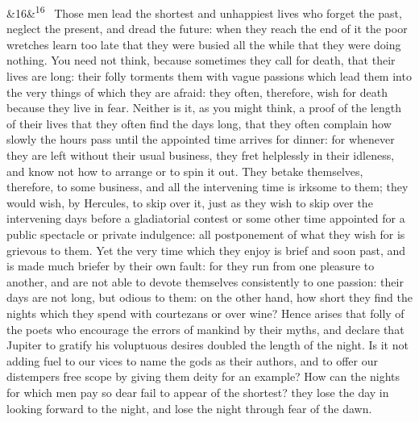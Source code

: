 \documentclass[12pt]{article}
\newcommand{\para}[1][]{\par\noindent\ifx&#1&\else\textsuperscript{\footnotesize #1}~\fi}
\begin{document}
\para[16] Those men lead the shortest and unhappiest lives who forget the past, neglect the present, and dread the future: when they reach the end of it the poor wretches learn too late that they were busied all the while that they were doing nothing. You need not think, because sometimes they call for death, that their lives are long: their folly torments them with vague passions which lead them into the very things of which they are afraid: they often, therefore, wish for death because they live in fear. Neither is it, as you might think, a proof of the length of their lives that they often find the days long, that they often complain how slowly the hours pass until the appointed time arrives for dinner: for whenever they are left without their usual business, they fret helplessly in their idleness, and know not how to arrange or to spin it out. They betake themselves, therefore, to some business, and all the intervening time is irksome to them; they would wish, by Hercules, to skip over it, just as they wish to skip over the intervening days before a gladiatorial contest or some other time appointed for a public spectacle or private indulgence: all postponement of what they wish for is grievous to them. Yet the very time which they enjoy is brief and soon past, and is made much briefer by their own fault: for they run from one pleasure to another, and are not able to devote themselves consistently to one passion: their days are not long, but odious to them: on the other hand, how short they find the nights which they spend with courtezans or over wine? Hence arises that folly of the poets who encourage the errors of mankind by their myths, and declare that Jupiter to gratify his voluptuous desires doubled the length of the night. Is it not adding fuel to our vices to name the gods as their authors, and to offer our distempers free scope by giving them deity for an example? How can the nights for which men pay so dear fail to appear of the shortest? they lose the day in looking forward to the night, and lose the night through fear of the dawn.
\end{document}
